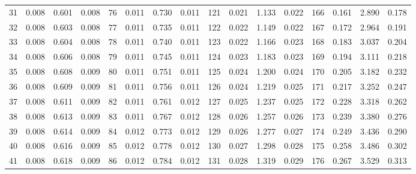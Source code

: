 \begin{table}
{\begin{tabular}{rrrr|rrrr|rrrr|crrr}
 31 & \tiny{  0.008} &   0.601 & \tiny{  0.008} &  76 & \tiny{  0.011} &   0.730 & \tiny{  0.011} & 121 & \tiny{  0.021} &   1.133 & \tiny{  0.022} & 166 & \tiny{  0.161} &   2.890 & \tiny{  0.178}\\
 32 & \tiny{  0.008} &   0.603 & \tiny{  0.008} &  77 & \tiny{  0.011} &   0.735 & \tiny{  0.011} & 122 & \tiny{  0.022} &   1.149 & \tiny{  0.022} & 167 & \tiny{  0.172} &   2.964 & \tiny{  0.191}\\
 33 & \tiny{  0.008} &   0.604 & \tiny{  0.008} &  78 & \tiny{  0.011} &   0.740 & \tiny{  0.011} & 123 & \tiny{  0.022} &   1.166 & \tiny{  0.023} & 168 & \tiny{  0.183} &   3.037 & \tiny{  0.204}\\
 34 & \tiny{  0.008} &   0.606 & \tiny{  0.008} &  79 & \tiny{  0.011} &   0.745 & \tiny{  0.011} & 124 & \tiny{  0.023} &   1.183 & \tiny{  0.023} & 169 & \tiny{  0.194} &   3.111 & \tiny{  0.218}\\
 35 & \tiny{  0.008} &   0.608 & \tiny{  0.009} &  80 & \tiny{  0.011} &   0.751 & \tiny{  0.011} & 125 & \tiny{  0.024} &   1.200 & \tiny{  0.024} & 170 & \tiny{  0.205} &   3.182 & \tiny{  0.232}\\
 36 & \tiny{  0.008} &   0.609 & \tiny{  0.009} &  81 & \tiny{  0.011} &   0.756 & \tiny{  0.011} & 126 & \tiny{  0.024} &   1.219 & \tiny{  0.025} & 171 & \tiny{  0.217} &   3.252 & \tiny{  0.247}\\
 37 & \tiny{  0.008} &   0.611 & \tiny{  0.009} &  82 & \tiny{  0.011} &   0.761 & \tiny{  0.012} & 127 & \tiny{  0.025} &   1.237 & \tiny{  0.025} & 172 & \tiny{  0.228} &   3.318 & \tiny{  0.262}\\
 38 & \tiny{  0.008} &   0.613 & \tiny{  0.009} &  83 & \tiny{  0.011} &   0.767 & \tiny{  0.012} & 128 & \tiny{  0.026} &   1.257 & \tiny{  0.026} & 173 & \tiny{  0.239} &   3.380 & \tiny{  0.276}\\
 39 & \tiny{  0.008} &   0.614 & \tiny{  0.009} &  84 & \tiny{  0.012} &   0.773 & \tiny{  0.012} & 129 & \tiny{  0.026} &   1.277 & \tiny{  0.027} & 174 & \tiny{  0.249} &   3.436 & \tiny{  0.290}\\
 40 & \tiny{  0.008} &   0.616 & \tiny{  0.009} &  85 & \tiny{  0.012} &   0.778 & \tiny{  0.012} & 130 & \tiny{  0.027} &   1.298 & \tiny{  0.028} & 175 & \tiny{  0.258} &   3.486 & \tiny{  0.302}\\
 41 & \tiny{  0.008} &   0.618 & \tiny{  0.009} &  86 & \tiny{  0.012} &   0.784 & \tiny{  0.012} & 131 & \tiny{  0.028} &   1.319 & \tiny{  0.029} & 176 & \tiny{  0.267} &   3.529 & \tiny{  0.313}\\

\end{tabular}}
\end{table}
